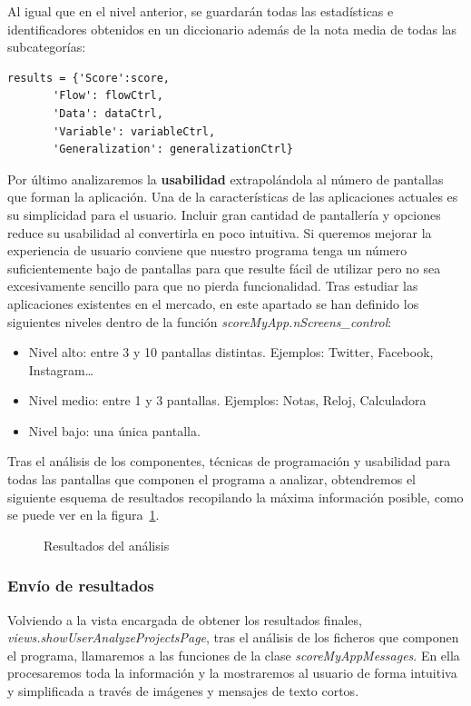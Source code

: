 \documentclass[a4paper, 12pt]{book}
\begin{document}
Al igual que en el nivel anterior, se guardarán todas las estadísticas e identificadores obtenidos en un diccionario además de la nota media de todas las subcategorías:
\begin{lstlisting}
results = {'Score':score,
       'Flow': flowCtrl,
       'Data': dataCtrl,
       'Variable': variableCtrl,
       'Generalization': generalizationCtrl}
\end{lstlisting}

Por último analizaremos la \textbf{usabilidad} extrapolándola al número de pantallas que forman la aplicación. Una de la características de las aplicaciones actuales es su simplicidad para el usuario. Incluir gran cantidad de pantallería y opciones reduce su usabilidad al convertirla en poco intuitiva. Si queremos mejorar la experiencia de usuario conviene que nuestro programa tenga un número suficientemente bajo de pantallas para que resulte fácil de utilizar pero no sea excesivamente sencillo para que no pierda funcionalidad. Tras estudiar las aplicaciones existentes en el mercado, en este apartado se han definido los siguientes niveles dentro de la función \textit{scoreMyApp.nScreens\_control}:

\begin{itemize}
	\item Nivel alto: entre 3 y 10 pantallas distintas. Ejemplos: Twitter, Facebook, Instagram\ldots
	\item Nivel medio: entre 1 y 3 pantallas. Ejemplos: Notas, Reloj, Calculadora
	\item Nivel bajo: una única pantalla.  
\end{itemize}

Tras el análisis de los componentes, técnicas de programación y usabilidad para todas las pantallas que componen el programa a analizar, obtendremos el siguiente esquema de resultados recopilando la máxima información posible, como se puede ver en la figura~\ref{fig:scoreAppInventor}.
\begin{figure}
  \caption{Resultados del análisis}
  \label{fig:scoreAppInventor}
\end{figure}
\subsubsection{Envío de resultados}
Volviendo a la vista encargada de obtener los resultados finales, \textit{views.showUserAnalyzeProjectsPage}, tras el análisis de los ficheros que componen el programa, llamaremos a las funciones de la clase \textit{scoreMyAppMessages}. En ella procesaremos toda la información y la mostraremos al usuario de forma intuitiva y simplificada a través de imágenes y mensajes de texto cortos. 
 
\end{document}

